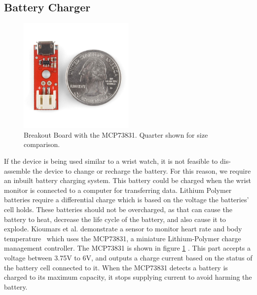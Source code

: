 \subsection{Battery Charger}
\label{Sec:BattCharger}
\begin{figure}
\begin{center}
\includegraphics[width=0.5\textwidth]{images/MCP73Breakout.jpg}
\caption{Breakout Board with the MCP73831. Quarter shown for size comparison.}
\label{Fig:MCPCharger}
\end{center}
\end{figure}
If the device is being used similar to a wrist watch,
it is not feasible to dis-assemble the device to change or recharge the battery.
For this reason, 
we require an inbuilt battery charging system.
This battery could be charged when the wrist monitor is connected to a computer for transferring data.
Lithium Polymer batteries require a differential charge which is based on the voltage the batteries' cell holds.
These batteries should not be overcharged, 
as that can cause the battery to heat,
decrease the life cycle of the battery,
and also cause it to explode.
Kioumars et al. demonstrate a sensor to monitor heart rate and body temperature~\cite{kioumars2011atmega}
which uses the MCP73831, a miniature Lithium-Polymer charge management controller.
The MCP73831 is shown in figure \ref{Fig:MCPCharger} \cite{Web:MCPIC}.
This part accepts a voltage between 3.75V to 6V,
and outputs a charge current based on the status of the battery cell connected to it.
When the MCP73831 detects a battery is charged to its maximum capacity,
it stops supplying current to avoid harming the battery.

